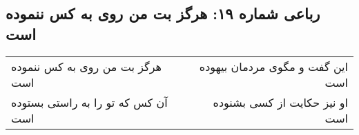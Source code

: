 \begin{center}
\section*{رباعی شماره ۱۹: هرگز بت من روی به کس ننموده است}
\label{sec:019}
\begin{longtable}{l p{0.5cm} r}
هرگز بت من روی به کس ننموده است
&&
این گفت و مگوی مردمان بیهوده است
\\
آن کس که تو را به راستی بستوده است
&&
او نیز حکایت از کسی بشنوده است
\\
\end{longtable}
\end{center}
